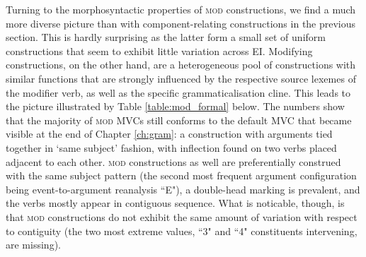 
Turning to the morphosyntactic properties of \textsc{mod} constructions, we find a much more diverse picture than with component-relating constructions in the previous section. This is hardly surprising as the latter form a small set of uniform constructions that seem to exhibit little variation across EI. Modifying constructions, on the other hand, are a heterogeneous pool of constructions with similar functions that are strongly influenced by the respective source lexemes of the modifier verb, as well as the specific grammaticalisation cline. This leads to the picture illustrated by Table \ref{table:mod_formal} below. The numbers show that the majority of \textsc{mod} MVCs still conforms to the default \textsc{MVC} that became visible at the end of Chapter \ref{ch:gram}: a construction with arguments tied together in `same subject' fashion, with inflection found on two verbs placed adjacent to each other. \textsc{mod} constructions as well are preferentially construed with the same subject pattern (the second most frequent argument configuration being event-to-argument reanalysis ``E"), a double-head marking is prevalent, and the verbs mostly appear in contiguous sequence. What is noticable, though, is that \textsc{mod} constructions do not exhibit the same amount of variation with respect to contiguity (the two most extreme values, ``3" and ``4" constituents intervening, are missing).

